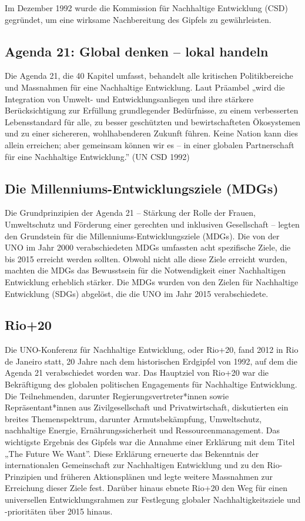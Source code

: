 \documentclass[
  nswissgerman,
  a4paper,
  DIV=11,
  numbers=noendperiod,
  oneside,
  openany]{scrreprt}
\begin{document}
Im Dezember 1992 wurde die Kommission für Nachhaltige Entwicklung (CSD)
gegründet, um eine wirksame Nachbereitung des Gipfels zu gewährleisten.

\subsection{Agenda 21: Global denken -- lokal
handeln}\label{agenda-21-global-denken-lokal-handeln}

Die Agenda 21, die 40 Kapitel umfasst, behandelt alle kritischen
Politikbereiche und Massnahmen für eine Nachhaltige Entwicklung. Laut
Präambel „wird die Integration von Umwelt- und Entwicklungsanliegen und
ihre stärkere Berücksichtigung zur Erfüllung grundlegender Bedürfnisse,
zu einem verbesserten Lebensstandard für alle, zu besser geschützten und
bewirtschafteten Ökosystemen und zu einer sichereren, wohlhabenderen
Zukunft führen. Keine Nation kann dies allein erreichen; aber gemeinsam
können wir es -- in einer globalen Partnerschaft für eine Nachhaltige
Entwicklung.'' (UN CSD 1992)

\subsection{Die Millenniums-Entwicklungsziele
(MDGs)}\label{die-millenniums-entwicklungsziele-mdgs}

Die Grundprinzipien der Agenda 21 -- Stärkung der Rolle der Frauen,
Umweltschutz und Förderung einer gerechten und inklusiven Gesellschaft
-- legten den Grundstein für die Millenniums-Entwicklungsziele (MDGs).
Die von der UNO im Jahr 2000 verabschiedeten MDGs umfassten acht
spezifische Ziele, die bis 2015 erreicht werden sollten. Obwohl nicht
alle diese Ziele erreicht wurden, machten die MDGs das Bewusstsein für
die Notwendigkeit einer Nachhaltigen Entwicklung erheblich stärker. Die
MDGs wurden von den Zielen für Nachhaltige Entwicklung (SDGs) abgelöst,
die die UNO im Jahr 2015 verabschiedete.

\subsection{Rio+20}\label{rio20}

Die UNO-Konferenz für Nachhaltige Entwicklung, oder Rio+20, fand 2012 in
Rio de Janeiro statt, 20 Jahre nach dem historischen Erdgipfel von 1992,
auf dem die Agenda 21 verabschiedet worden war. Das Hauptziel von Rio+20
war die Bekräftigung des globalen politischen Engagements für
Nachhaltige Entwicklung. Die Teilnehmenden, darunter
Regierungsvertreter*innen sowie Repräsentant*innen aus Zivilgesellschaft
und Privatwirtschaft, diskutierten ein breites Themenspektrum, darunter
Armutsbekämpfung, Umweltschutz, nachhaltige Energie,
Ernährungssicherheit und Ressourcenmanagement. Das wichtigste Ergebnis
des Gipfels war die Annahme einer Erklärung mit dem Titel „The Future We
Want''. Diese Erklärung erneuerte das Bekenntnis der internationalen
Gemeinschaft zur Nachhaltigen Entwicklung und zu den Rio-Prinzipien und
früheren Aktionsplänen und legte weitere Massnahmen zur Erreichung
dieser Ziele fest. Darüber hinaus ebnete Rio+20 den Weg für einen
universellen Entwicklungsrahmen zur Festlegung globaler
Nachhaltigkeitsziele und -prioritäten über 2015 hinaus.
\end{document}
